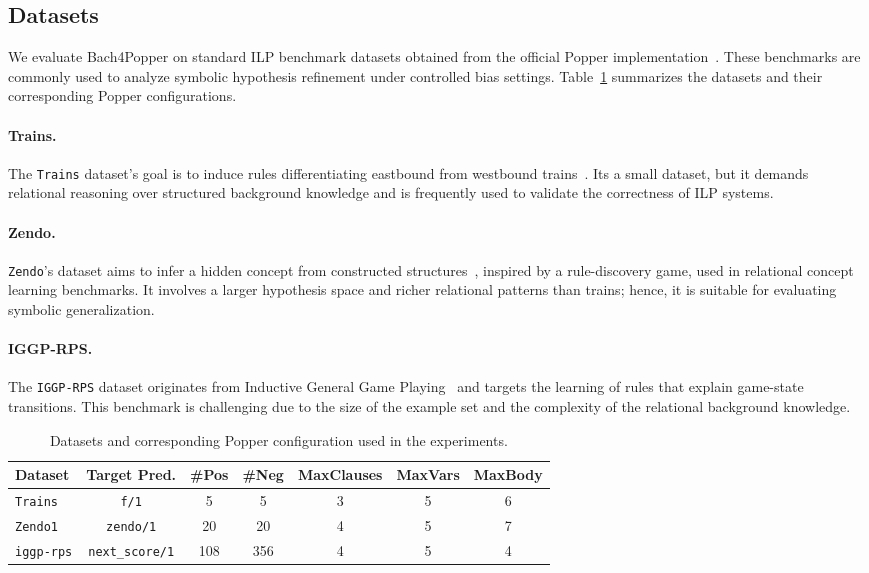 

\subsection{Datasets}
\label{sec:datasets}
We evaluate Bach4Popper on standard ILP benchmark datasets obtained from the official Popper implementation~\cite{popperv110}. These benchmarks are commonly used to analyze symbolic hypothesis refinement under controlled bias settings. Table~\ref{tab:datasets-config} summarizes the datasets and their corresponding Popper configurations.

\paragraph{Trains.}
The \texttt{Trains} dataset's goal is to induce rules differentiating eastbound from westbound trains~\cite{larson1977inductive}. Its a small dataset, but it demands relational reasoning over structured background knowledge and is frequently used to validate the correctness of ILP systems.

\paragraph{Zendo.}
\texttt{Zendo}'s dataset aims to infer a hidden concept from constructed structures~\cite{bramley2018grounding}, inspired by a rule-discovery game, used in relational concept learning benchmarks. 
It involves a larger hypothesis space and richer relational patterns  than trains; hence, it is suitable for evaluating symbolic generalization.

\paragraph{IGGP-RPS.}
The \texttt{IGGP-RPS} dataset originates from Inductive General Game Playing~\cite{cropper2020inductive} and targets the learning of rules that explain game-state transitions. This benchmark is challenging due to the size of the example set and the complexity of the relational background knowledge.

\begin{table}[htb]
\centering
\caption{Datasets and corresponding Popper configuration used in the experiments.}
\label{tab:datasets-config}
\begin{tabular}{lcccccc}
\toprule
\textbf{Dataset} & \textbf{Target Pred.} & \textbf{\#Pos} & \textbf{\#Neg} & \textbf{MaxClauses} & \textbf{MaxVars} & \textbf{MaxBody} \\
\midrule
\texttt{Trains}   & \texttt{f/1}              & 5   & 5   & 3 & 5 & 6 \\
\texttt{Zendo1}   & \texttt{zendo/1}          & 20  & 20  & 4 & 5 & 7 \\
\texttt{iggp-rps} & \texttt{next\_score/1}    & 108 & 356 & 4 & 5 & 4 \\
\bottomrule
\end{tabular}
\end{table}

